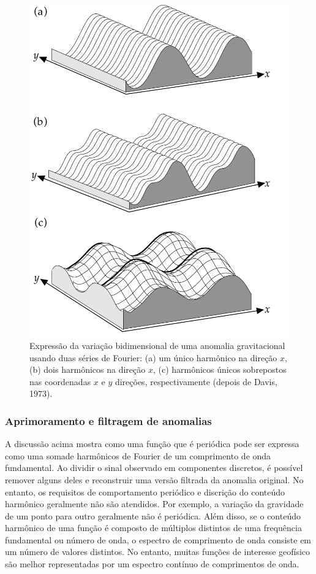 \documentclass[]{book}
\theoremstyle{definition}
\theoremstyle{definition}
\theoremstyle{definition}
\theoremstyle{remark}
\begin{document}
\begin{figure}

{\centering \includegraphics[width=0.8\linewidth]{fig/Fig_02.40} 

}

\caption{Expressão da variação bidimensional de uma anomalia gravitacional usando duas séries de Fourier: (a) um único harmônico na direção $x$, (b) dois harmônicos na direção $x$, (c) harmônicos únicos sobrepostos nas coordenadas $x$ e $y$ direções, respectivamente (depois de Davis, 1973).}\label{fig:anofourier}
\end{figure}

\hypertarget{aprimoramento-e-filtragem-de-anomalias}{%
\subsubsection{Aprimoramento e filtragem de anomalias}\label{aprimoramento-e-filtragem-de-anomalias}}

A discussão acima mostra como uma função que é periódica pode ser expressa como uma somade harmônicos de Fourier de um comprimento de onda fundamental. Ao dividir o sinal observado em componentes discretos, é possível remover alguns deles e reconstruir uma versão filtrada da anomalia original. No entanto, os requisitos de comportamento periódico e discrição do conteúdo harmônico geralmente não são atendidos. Por exemplo, a variação da gravidade de um ponto para outro geralmente não é periódica. Além disso, se o conteúdo harmônico de uma função é composto de múltiplos distintos de uma frequência fundamental ou número de onda, o espectro de comprimento de onda consiste em um número de valores distintos. No entanto, muitas funções de interesse geofísico são melhor representadas por um espectro contínuo de comprimentos de onda.
\end{document}
